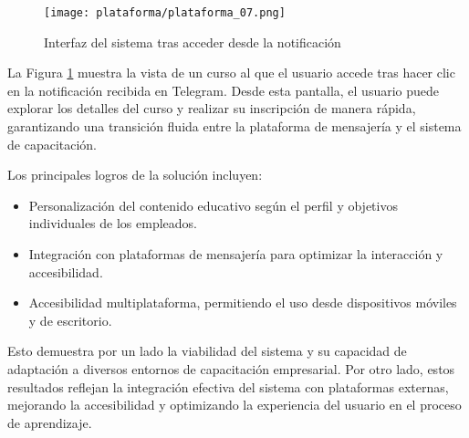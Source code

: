 \begin{figure}[H]
    \centering
    \texttt{[image: plataforma/plataforma\_07.png]}
    \caption{Interfaz del sistema tras acceder desde la notificación}
    \label{fig:interfaz_curso_ejemplo}
\end{figure}

La Figura \ref{fig:interfaz_curso_ejemplo} muestra la vista de un curso al que
el usuario accede tras hacer clic en la notificación recibida en Telegram. Desde
esta pantalla, el usuario puede explorar los detalles del curso y realizar su
inscripción de manera rápida, garantizando una transición fluida entre la
plataforma de mensajería y el sistema de capacitación.

Los principales logros de la solución incluyen:
\begin{itemize}
    \item Personalización del contenido educativo según el perfil y objetivos
    individuales de los empleados.
    \item Integración con plataformas de mensajería para optimizar la
    interacción y accesibilidad.
    \item Accesibilidad multiplataforma, permitiendo el uso desde dispositivos
    móviles y de escritorio.
\end{itemize}

Esto demuestra por un lado la viabilidad del sistema y su capacidad de
adaptación a diversos entornos de capacitación empresarial. Por otro lado, estos
resultados reflejan la integración efectiva del sistema con plataformas
externas, mejorando la accesibilidad y optimizando la experiencia del usuario en
el proceso de aprendizaje.

